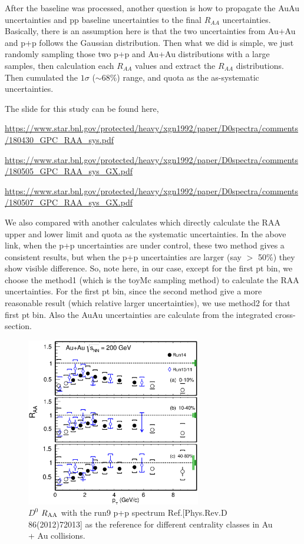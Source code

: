 After the baseline was processed, another question is how to propagate the AuAu uncertainties and pp baseline uncertainties to the final $R_{AA}$ uncertainties. Basically, there is an assumption here is that the two uncertainties from Au+Au and p+p follows the Gaussian distribution. Then what we did is simple, we just randomly sampling those two p+p and Au+Au distributions with a large samples, then calculation each $R_{AA}$ values and extract the $R_{AA}$ distributions. Then cumulated the $1\sigma$ ($\sim68\%$) range, and quota as the as-systematic uncertainties.

The slide for this study can be found here, 

\url{https://www.star.bnl.gov/protected/heavy/xgn1992/paper/D0spectra/comments/180430_GPC_RAA_sys.pdf}

\url{https://www.star.bnl.gov/protected/heavy/xgn1992/paper/D0spectra/comments/180505_GPC_RAA_sys_GX.pdf}

\url{https://www.star.bnl.gov/protected/heavy/xgn1992/paper/D0spectra/comments/180507_GPC_RAA_sys_GX.pdf}

We also compared with another calculates which directly calculate the RAA upper and lower limit and quota as the systematic uncertainties. In the above link, when the p+p uncertainties are under control, these two method gives a consistent results, but when the p+p uncertainties are larger (say $>$ 50\%) they show visible difference. So, note here, in our case, except for the first pt bin, we choose the method1 (which is the toyMc sampling method) to calculate the RAA uncertainties. For the first pt bin, since the second method give a more reasonable result (which relative larger uncertainties), we use method2 for that first pt bin. Also the AuAu uncertainties are calculate from the integrated cross-section.


\begin{figure}
\centering
\includegraphics[width=0.68\textwidth]{figure/Run14_D0HFT/D0_RAA.eps}
\caption{$D^{0}$ $R_{\rm AA}$ with the run9 p+p spectrum Ref.[Phys.Rev.D 86(2012)72013] as the reference for different centrality classes in Au + Au collisions.}
\label{D0_RAA} 
\end{figure}

